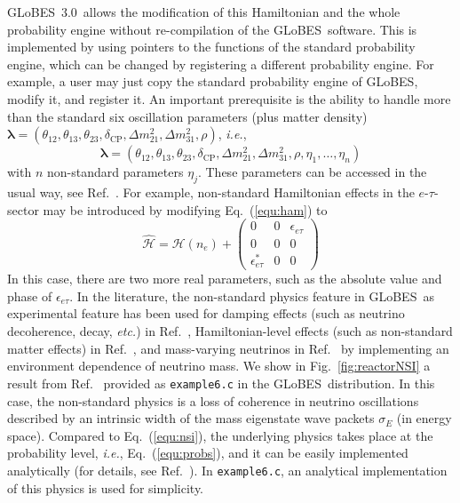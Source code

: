 \documentclass[12pt,a4paper]{article}
\newcommand{\ie}{{\it i.e.}}
\newcommand{\etc}{{\it etc.}}
\newcommand{\eq}{Eq.}
\newcommand{\fig}{Fig.}
\newcommand{\Ref}{Ref.}
\newcommand{\ldm}{\Delta m_{31}^2}
\newcommand{\sdm}{\Delta m_{21}^2}
\newcommand{\deltacp}{\delta_{\mathrm{CP}}}
\newcommand{\GLOBES}{{\sf GLoBES}}
\newcommand{\GLOBESN}{{\sf GLoBES~3.0}}
\newcommand{\equ}[1]{\eq~(\ref{equ:#1})}
\newcommand{\figu}[1]{\fig~\ref{fig:#1}}
\begin{document}
\GLOBESN\ allows the modification of this Hamiltonian and the whole probability engine without
re-compilation of the \GLOBES\ software. This is implemented
by using pointers to the functions of the standard probability engine, which can be changed by
registering a different probability engine. For example, a user may just copy the standard probability
engine of \GLOBES , modify it, and register it. An important prerequisite is the ability to handle
more than the standard six oscillation parameters (plus matter density) $\boldsymbol{\lambda}=(\theta_{12},\theta_{13}, \theta_{23}, \deltacp, \sdm, \ldm, \rho)$, \ie,
\begin{equation}
\boldsymbol{\lambda}=(\theta_{12},\theta_{13}, \theta_{23}, \deltacp, \sdm, \ldm, \rho, \eta_1, \hdots, \eta_n)
\end{equation}
with $n$ non-standard parameters $\eta_j$. These parameters can be accessed in the usual way, see \Ref~\cite{Manual}.
For example, non-standard Hamiltonian effects in the $e$-$\tau$-sector may be introduced by modifying \equ{ham} to
\begin{equation}
 \mathcal{\hat{H}} = \mathcal{H}(n_e) + 
\left(
\begin{array}{ccc}
0 & 0 & \epsilon_{e \tau} \\
0 & 0 & 0 \\
\epsilon_{e \tau}^* & 0 & 0 
\end{array}
\right)
\label{equ:nsi}
\end{equation}
In this case, there are two more real parameters, such as the absolute value and phase of $\epsilon_{e \tau}$.
In the literature, the non-standard physics feature in \GLOBES\ as experimental feature has been used for damping effects (such as neutrino decoherence, decay, \etc) in \Ref~\cite{Blennow:2005yk}, Hamiltonian-level effects (such as non-standard matter effects) in \Ref~\cite{Blennow:2005qj}, and mass-varying neutrinos in \Ref~\cite{Schwetz:2005fy} by implementing an environment dependence of neutrino mass. 
We show in \figu{reactorNSI} a result from \Ref~\cite{Blennow:2005yk} provided as {\tt example6.c} in the \GLOBES\
distribution. In this case, the non-standard physics is a loss of coherence in neutrino oscillations
described by an intrinsic width of the mass eigenstate wave packets $\sigma_E$ (in energy space).
Compared to \equ{nsi}, the underlying physics takes place at the probability level, \ie, 
\equ{probs}, and it can be easily implemented analytically (for details, see \Ref~\cite{Blennow:2005yk}). 
In {\tt example6.c}, an analytical implementation
of this physics is used for simplicity.
\end{document}
